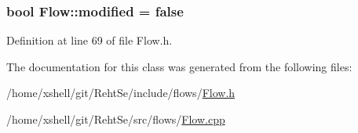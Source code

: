 \subsubsection[{\texorpdfstring{modified}{modified}}]{\setlength{\rightskip}{0pt plus 5cm}bool Flow\+::modified = false\hspace{0.3cm}{\ttfamily [protected]}}\hypertarget{class_flow_ae5faa5bcc061f892714082b3dc199408}{}\label{class_flow_ae5faa5bcc061f892714082b3dc199408}


Definition at line 69 of file Flow.\+h.



The documentation for this class was generated from the following files\+:\begin{DoxyCompactItemize}
\item 
/home/xshell/git/\+Reht\+Se/include/flows/\hyperlink{_flow_8h}{Flow.\+h}\item 
/home/xshell/git/\+Reht\+Se/src/flows/\hyperlink{_flow_8cpp}{Flow.\+cpp}\end{DoxyCompactItemize}

